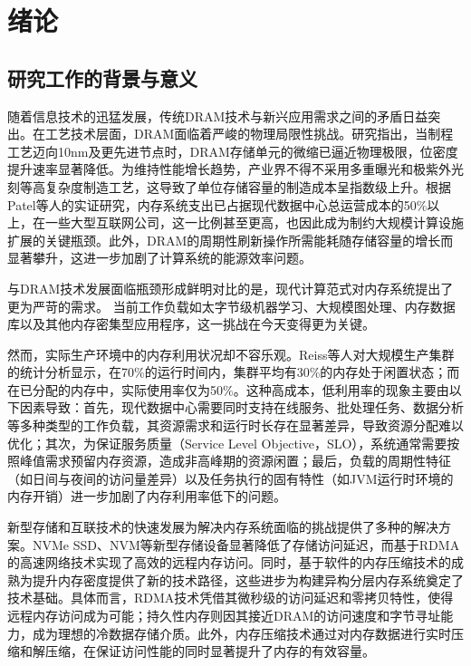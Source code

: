 \chapter{绪\hspace{6pt}论}



\section{研究工作的背景与意义}

随着信息技术的迅猛发展，传统DRAM技术与新兴应用需求之间的矛盾日益突出。在工艺技术层面，DRAM面临着严峻的物理局限性挑战。研究指出，当制程工艺迈向10nm及更先进节点时，DRAM存储单元的微缩已逼近物理极限，位密度提升速率显著降低。为维持性能增长趋势，产业界不得不采用多重曝光和极紫外光刻等高复杂度制造工艺，这导致了单位存储容量的制造成本呈指数级上升。根据Patel等人的实证研究，内存系统支出已占据现代数据中心总运营成本的50\%以上，在一些大型互联网公司，这一比例甚至更高，也因此成为制约大规模计算设施扩展的关键瓶颈。此外，DRAM的周期性刷新操作所需能耗随存储容量的增长而显著攀升，这进一步加剧了计算系统的能源效率问题。

与DRAM技术发展面临瓶颈形成鲜明对比的是，现代计算范式对内存系统提出了更为严苛的需求。
当前工作负载如太字节级机器学习、大规模图处理、内存数据库以及其他内存密集型应用程序，这一挑战在今天变得更为关键。


然而，实际生产环境中的内存利用状况却不容乐观。Reiss等人对大规模生产集群的统计分析显示，在70\%的运行时间内，集群平均有30\%的内存处于闲置状态；而在已分配的内存中，实际使用率仅为50\%。这种高成本，低利用率的现象主要由以下因素导致：首先，现代数据中心需要同时支持在线服务、批处理任务、数据分析等多种类型的工作负载，其资源需求和运行时长存在显著差异，导致资源分配难以优化；其次，为保证服务质量（Service Level Objective，SLO），系统通常需要按照峰值需求预留内存资源，造成非高峰期的资源闲置；最后，负载的周期性特征（如日间与夜间的访问量差异）以及任务执行的固有特性（如JVM运行时环境的内存开销）进一步加剧了内存利用率低下的问题。

新型存储和互联技术的快速发展为解决内存系统面临的挑战提供了多种的解决方案。NVMe SSD、NVM等新型存储设备显著降低了存储访问延迟，而基于RDMA的高速网络技术实现了高效的远程内存访问。同时，基于软件的内存压缩技术的成熟为提升内存密度提供了新的技术路径，这些进步为构建异构分层内存系统奠定了技术基础。具体而言，RDMA技术凭借其微秒级的访问延迟和零拷贝特性，使得远程内存访问成为可能；持久性内存则因其接近DRAM的访问速度和字节寻址能力，成为理想的冷数据存储介质。此外，内存压缩技术通过对内存数据进行实时压缩和解压缩，在保证访问性能的同时显著提升了内存的有效容量。

